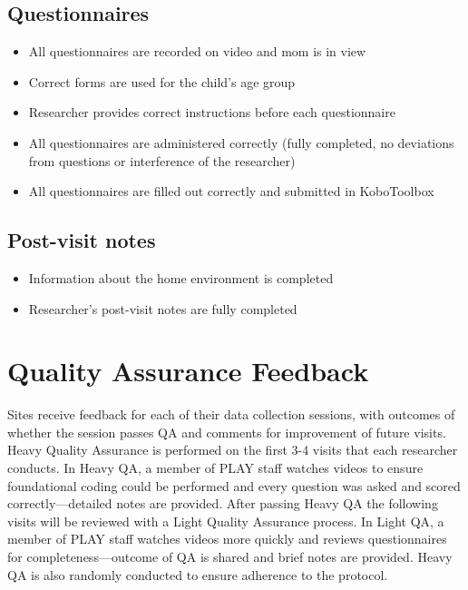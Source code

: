 \documentclass[
  12pt,
]{book}
\providecommand{\tightlist}{%
  \setlength{\itemsep}{0pt}\setlength{\parskip}{0pt}}
\begin{document}
\hypertarget{questionnaires-1}{%
\subsection{Questionnaires}\label{questionnaires-1}}

\begin{itemize}
\tightlist
\item
  All questionnaires are recorded on video and mom is in view
\item
  Correct forms are used for the child's age group
\item
  Researcher provides correct instructions before each questionnaire
\item
  All questionnaires are administered correctly (fully completed, no deviations from questions or interference of the researcher)
\item
  All questionnaires are filled out correctly and submitted in KoboToolbox
\end{itemize}

\hypertarget{post-visit-notes}{%
\subsection{Post-visit notes}\label{post-visit-notes}}

\begin{itemize}
\tightlist
\item
  Information about the home environment is completed
\item
  Researcher's post-visit notes are fully completed
\end{itemize}

\hypertarget{quality-assurance-feedback}{%
\section{Quality Assurance Feedback}\label{quality-assurance-feedback}}

Sites receive feedback for each of their data collection sessions, with outcomes of whether the session passes QA and comments for improvement of future visits. Heavy Quality Assurance is performed on the first 3-4 visits that each researcher conducts. In Heavy QA, a member of PLAY staff watches videos to ensure foundational coding could be performed and every question was asked and scored correctly---detailed notes are provided. After passing Heavy QA the following visits will be reviewed with a Light Quality Assurance process. In Light QA, a member of PLAY staff watches videos more quickly and reviews questionnaires for completeness---outcome of QA is shared and brief notes are provided. Heavy QA is also randomly conducted to ensure adherence to the protocol.
\end{document}
